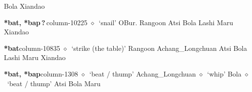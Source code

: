 \hspace{1ex}
         Bola 
\hspace{1ex}
         Xiandao 
  \item {\footnotesize \textbf{*bat, *bap\,?\,}}{\tiny column-10225}
         $\diamond$~`snail'
         OBur. 
\hspace{1ex}
         Rangoon 
\hspace{1ex}
         Atsi 
\hspace{1ex}
         Bola 
\hspace{1ex}
         Lashi 
\hspace{1ex}
         Maru 
\hspace{1ex}
         Xiandao 
  \item {\footnotesize \textbf{*bat}}{\tiny column-10835}
         $\diamond$~`strike (the table)'
         Rangoon 
\hspace{1ex}
         Achang\_Longchuan 
\hspace{1ex}
         Atsi 
\hspace{1ex}
         Bola 
\hspace{1ex}
         Lashi 
\hspace{1ex}
         Maru 
\hspace{1ex}
         Xiandao 
  \item {\footnotesize \textbf{*bat, *bap}}{\tiny column-1308}
         $\diamond$~`beat / thump'
         Achang\_Longchuan 
\hspace{1ex}
         $\diamond$~`whip'
         Bola 
\hspace{1ex}
         $\diamond$~`beat / thump'
         Atsi 
\hspace{1ex}
         Bola 
\hspace{1ex}
         Maru 
\hspace{1ex}
